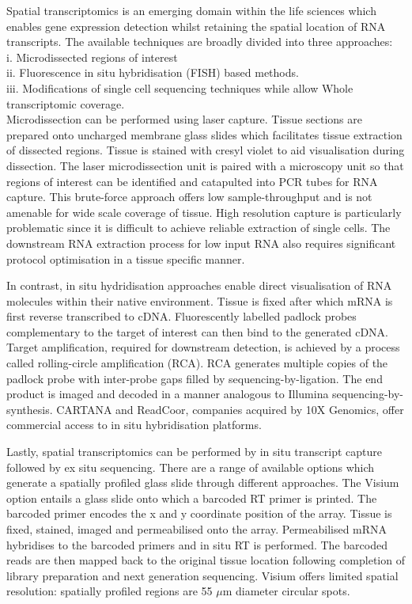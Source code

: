 Spatial transcriptomics is an emerging domain within the life sciences which enables gene expression detection whilst retaining the spatial location of RNA transcripts. The available techniques are broadly divided into three approaches: 																\\
i. Microdissected regions of interest														\\
ii. Fluorescence in situ hybridisation (FISH) based methods. 								\\
iii. Modifications of single cell sequencing techniques while allow Whole transcriptomic coverage. 																					\\									
Microdissection can be performed using laser capture. Tissue sections are prepared onto uncharged membrane glass slides which facilitates tissue extraction of dissected regions. Tissue is stained with cresyl violet to aid visualisation during dissection. The laser microdissection unit is paired with a microscopy unit so that regions of interest can be identified and catapulted into PCR tubes for RNA capture. This brute-force approach offers low sample-throughput and is not amenable for wide scale coverage of tissue. High resolution capture is particularly problematic since it is difficult to achieve reliable extraction of single cells. The downstream RNA extraction process for low input RNA also requires significant protocol optimisation in a tissue specific manner.

In contrast, in situ hydridisation approaches enable direct visualisation of RNA molecules within their native environment. Tissue is fixed after which mRNA is first reverse transcribed to cDNA. 
Fluorescently labelled padlock probes complementary to the target of interest can then bind to the generated cDNA. Target amplification, required for downstream detection, is achieved by a process called rolling-circle amplification (RCA). RCA generates multiple copies of the padlock probe with inter-probe gaps filled by sequencing-by-ligation. The end product is imaged and decoded in a manner analogous to Illumina sequencing-by-synthesis. CARTANA and ReadCoor, companies acquired by 10X Genomics, offer commercial access to in situ hybridisation platforms.

Lastly, spatial transcriptomics can be performed by in situ transcript capture followed by ex situ sequencing. There are a range of available options which generate a spatially profiled glass slide through different approaches. The Visium option entails a glass slide onto which a barcoded RT primer is printed. The barcoded primer encodes the x and y coordinate position of the array. Tissue is fixed, stained, imaged and permeabilised onto the array. Permeabilised mRNA hybridises to the barcoded primers and in situ RT is performed. The barcoded reads are then mapped back to the original tissue location following completion of library preparation and next generation sequencing. Visium offers limited spatial resolution: spatially profiled regions are 55 $\mu$m diameter circular spots.

